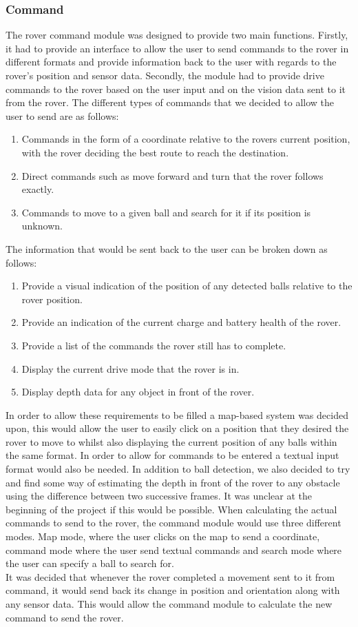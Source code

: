 \documentclass[10pt,twoside]{article}
\begin{document}
\subsubsection{Command}
The rover command module was designed to provide two main functions. Firstly, it had to provide an interface to allow the user to send commands to the rover in different formats and provide information back to the user with regards to the rover's position and sensor data. Secondly, the module had to provide drive commands to the rover based on the user input and on the vision data sent to it from the rover. 
\smallbreak
The different types of commands that we decided to allow the user to send are as follows:
\begin{enumerate}
  \item Commands in the form of a coordinate relative to the rovers current position, with the rover deciding the best route to reach the destination.
  \item Direct commands such as move forward and turn that the rover follows exactly.
  \item Commands to move to a given ball and search for it if its position is unknown. 
\end{enumerate}
The information that would be sent back to the user can be broken down as follows:
\begin{enumerate}
  \item Provide a visual indication of the position of any detected balls relative to the rover position.
  \item Provide an indication of the current charge and battery health of the rover.
  \item Provide a list of the commands the rover still has to complete.
  \item Display the current drive mode that the rover is in.
  \item Display depth data for any object in front of the rover.
\end{enumerate}
In order to allow these requirements to be filled a map-based system was decided upon, this would allow the user to easily click on a position that they desired the rover to move to whilst also displaying the current position of any balls within the same format. In order to allow for commands to be entered a textual input format would also be needed. In addition to ball detection, we also decided to try and find some way of estimating the depth in front of the rover to any obstacle using the difference between two successive frames. It was unclear at the beginning of the project if this would be possible.
\smallbreak
When calculating the actual commands to send to the rover, the command module would use three different modes. Map mode, where the user clicks on the map to send a coordinate, command mode where the user send textual commands and search mode where the user can specify a ball to search for.
\\
It was decided that whenever the rover completed a movement sent to it from command, it would send back its change in position and orientation along with any sensor data. This would allow the command module to calculate the new command to send the rover.
\end{document}
